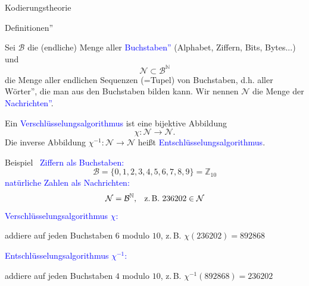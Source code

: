\documentclass{beamer}
\newcommand{\mc}{\mathcal}
\newcommand{\N}{\mathbb{N}}
\newcommand{\Z}{\mathbb{Z}}
\newcommand{\tb}[1]{{\textcolor{blue}{#1}}}
\theoremstyle{plain}
\begin{document}
\begin{frame}{Kodierungstheorie}{~}
\begin{center}
\end{center}
\end{frame}

\begin{frame}{\glqq Definitionen''}{~}
 \begin{block}{}
 Sei $\mc B$ die (endliche) Menge aller \tb{\glqq Buchstaben''} (Alphabet, Ziffern, Bits, Bytes...) und 
 $$\mc N \subset \mc B^{\N}$$
 die Menge aller endlichen Sequenzen (=Tupel) von Buchstaben, d.h. aller \glqq Wörter'', die man aus den Buchstaben bilden kann. Wir nennen $\mc N$ die Menge der \tb{\glqq Nachrichten''}.
 \end{block}
 \pause
 \begin{block}{}
  Ein \tb{Verschlüsselungsalgorithmus} ist eine bijektive Abbildung
  $$\chi: \mc N \rightarrow \mc N.$$
  Die inverse Abbildung $\chi^{-1}: \mc N \rightarrow \mc N$ heißt \tb{Entschlüsselungsalgorithmus}.
 \end{block}
\end{frame}

\begin{frame}{Beispiel}{~}
\tb{Ziffern als Buchstaben:} 
\[\mc B = \{0, 1, 2, 3, 4, 5, 6, 7, 8, 9\} = \Z_{10}\]
\tb{natürliche Zahlen als Nachrichten:}
\[\mc N = \mc B^{\N}, \;\;\; \text{z.\,B. } 236202 \in \mc N\] \pause
\tb{Verschlüsselungsalgorithmus $\chi$:}
\begin{center}addiere auf jeden Buchstaben $6$ modulo $10$, z.\,B. $\chi(236202) = 892868$\end{center} \pause
\tb{Entschlüsselungsalgorithmus $\chi^{-1}$:} \pause
\begin{center}addiere auf jeden Buchstaben $4$ modulo $10$, z.\,B. $\chi^{-1}(892868) = 236202$ \end{center}
\end{frame}
\end{document}
